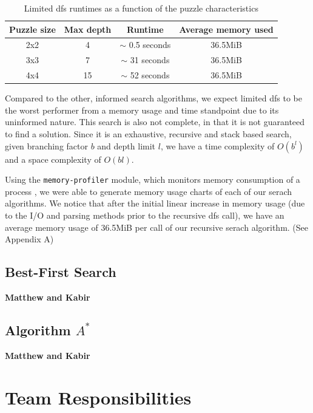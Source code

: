 \documentclass[runningheads]{llncs}
\begin{document}
\begin{table}
    \centering
    \caption{Limited dfs runtimes as a function of the puzzle characteristics}\label{tab1}
    \begin{tabular}{|c|c|c|c|}
        \hline
        \textbf{Puzzle size} & \textbf{Max depth} & \textbf{Runtime} & \textbf{Average memory used} \\
        \hline
        2x2 & 4 & $\sim$ 0.5 seconds & 36.5MiB \\ \hline
        3x3 & 7 & $\sim$ 31 seconds & 36.5MiB \\ \hline
        4x4 & 15 & $\sim$ 52 seconds & 36.5MiB \\ \hline
    \end{tabular}
\end{table}

Compared to the other, informed search algorithms, we expect limited dfs to be the worst performer from a memory usage and time standpoint due to its uninformed nature. This search is also not complete, in that it is not guaranteed to find a solution. Since it is an exhaustive, recursive and stack based search, given branching factor $b$ and depth limit $l$, we have a time complexity of $O(b^l)$ and a space complexity of $O(bl)$. \cite{ref_2}

Using the \verb|memory-profiler| module, which monitors memory consumption of a process \cite{ref_1}, we were able to generate memory usage charts of each of our serach algorithms. We notice that after the initial linear increase in memory usage (due to the I/O and parsing methods prior to the recursive dfs call), we have an average memory usage of 36.5MiB per call of our recursive serach algorithm. (See Appendix A)

\subsection{Best-First Search}

\textbf{Matthew and Kabir}

\subsection{Algorithm $A^{*}$}

\textbf{Matthew and Kabir}

\newpage
\section{Team Responsibilities}
\end{document}
